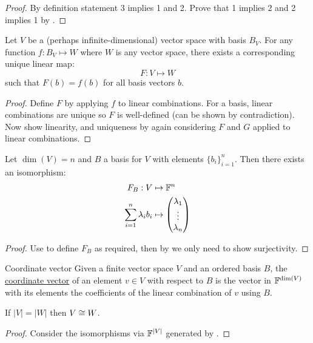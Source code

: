 \documentclass[../Main.tex]{subfiles}
\begin{document}
\begin{proof}
    By definition statement 3 implies 1 and 2. Prove that 1 implies 2 and 2 implies 1 by .
\end{proof}
\begin{proposition}
    Let $V$ be a (perhaps infinite-dimensional) vector space with basis $B_V$. For any function $f : B_V \mapsto W$ where $W$ is any vector space, there exists a corresponding unique linear map:
    \begin{equation*}
        F : V \mapsto W
    \end{equation*}
    such that $F(b) = f(b)$ for all basis vectors $b$.
    \label{propLinMapExtend}
\end{proposition}
\begin{proof}
    Define $F$ by applying $f$ to linear combinations. For a basis, linear combinations are unique so $F$ is well-defined (can be shown by contradiction). Now show linearity, and uniqueness by again considering $F$ and $G$ applied to linear combinations.
\end{proof}
\begin{corollary}
    Let $\dim(V) = n$ and $B$ a basis for $V$ with elements $\{b_i\}_{i = 1}^n$. Then there exists an isomorphism:
    \begin{align*}
        F_B : V &\mapsto \mathbb{F}^n\\
        \sum_{i=1}^n \lambda_i b_i &\mapsto
        \begin{pmatrix}\lambda_1 \\ \vdots \\ \lambda_n\end{pmatrix}
    \end{align*}
    \label{corCoordinateVectorMap}
\end{corollary}
\begin{proof}
    Use  to define $F_B$ as required, then by  we only need to show surjectivity.
\end{proof}
\begin{definition}{Coordinate vector}
    Given a finite vector space $V$ and an ordered basis $B$, the \underline{coordinate vector} of an element $v \in V$ with respect to $B$ is the vector in $\mathbb{F}^{\dim(V)}$ with its elements the coefficients of the linear combination of $v$ using $B$.
\end{definition}
\begin{corollary}
    If $|V| = |W|$ then $V \cong W$.
    \label{corSameSizeIsom}
\end{corollary}
\begin{proof}
    Consider the isomorphisms via $\mathbb{F}^{|V|}$ generated by .
\end{proof}
\end{document}
